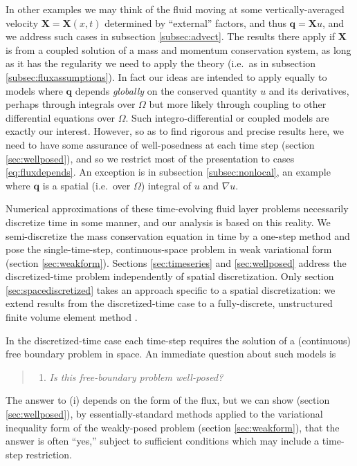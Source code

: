 \documentclass[final,leqno,onefignum,onetabnum]{siamltex1213bueler}
\newcommand\bq{\mathbf{q}}
\newcommand\bX{\mathbf{X}}
\renewcommand{\grad}{\nabla}
\begin{document}
In other examples we may think of the fluid moving at some vertically-averaged velocity $\bX=\bX(x,t)$ determined by ``external'' factors, and thus $\bq = \bX u$, and we address such cases in subsection \ref{subsec:advect}.  The results there apply if $\bX$ is from a coupled solution of a mass and momentum conservation system, as long as it has the regularity we need to apply the theory (i.e.~as in subsection \ref{subsec:fluxassumptions}).  In fact our ideas are intended to apply equally to models where $\bq$ depends \emph{globally} on the conserved quantity $u$ and its derivatives, perhaps through integrals over $\Omega$ but more likely through coupling to other differential equations over $\Omega$.  Such integro-differential or coupled models are exactly our interest.  However, so as to find rigorous and precise results here, we need to have some assurance of well-posedness at each time step (section \ref{sec:wellposed}), and so we restrict most of the presentation to cases \eqref{eq:fluxdepends}.  An exception is in subsection \ref{subsec:nonlocal}, an example where $\bq$ is a spatial (i.e.~over $\Omega$) integral of $u$ and $\grad u$.

Numerical approximations of these time-evolving fluid layer problems necessarily discretize time in some manner, and our analysis is based on this reality.  We semi-discretize the mass conservation equation in time by a one-step method and pose the single-time-step, continuous-space problem in weak variational form  (section \ref{sec:weakform}).  Sections \ref{sec:timeseries} and \ref{sec:wellposed} address the discretized-time problem independently of spatial discretization.  Only section \ref{sec:spacediscretized} takes an approach specific to a spatial discretization: we extend results from the discretized-time case to a fully-discrete, unstructured finite volume element method \cite{Cai1990}.

In the discretized-time case each time-step requires the solution of a (continuous) free boundary problem in space.  An immediate question about such models is
  \begin{quote}
  \renewcommand{\labelenumi}{(\roman{enumi})}
  \begin{enumerate}
  \item \emph{Is this free-boundary problem well-posed?}
  \end{enumerate}
  \end{quote}
The answer to (i) depends on the form of the flux, but we can show (section \ref{sec:wellposed}), by essentially-standard methods applied to the variational inequality form of the weakly-posed problem (section \ref{sec:weakform}), that the answer is often ``yes,'' subject to sufficient conditions which may include a time-step restriction.
\end{document}
